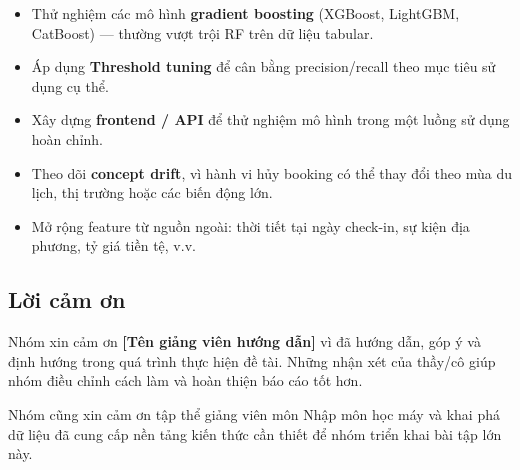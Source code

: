 \documentclass[12pt, a4paper]{article}
\begin{document}
\begin{itemize}
    \item Thử nghiệm các mô hình \textbf{gradient boosting} (XGBoost, LightGBM, CatBoost) --- thường vượt trội RF trên dữ liệu tabular.
    \item Áp dụng \textbf{Threshold tuning} để cân bằng precision/recall theo mục tiêu sử dụng cụ thể.
    \item Xây dựng \textbf{frontend / API} để thử nghiệm mô hình trong một luồng sử dụng hoàn chỉnh.
    \item Theo dõi \textbf{concept drift}, vì hành vi hủy booking có thể thay đổi theo mùa du lịch, thị trường hoặc các biến động lớn.
    \item Mở rộng feature từ nguồn ngoài: thời tiết tại ngày check-in, sự kiện địa phương, tỷ giá tiền tệ, v.v.
\end{itemize}

\subsection*{Lời cảm ơn}

Nhóm xin cảm ơn \textbf{[Tên giảng viên hướng dẫn]} vì đã hướng dẫn, góp ý và định hướng trong quá trình thực hiện đề tài. Những nhận xét của thầy/cô giúp nhóm điều chỉnh cách làm và hoàn thiện báo cáo tốt hơn.

Nhóm cũng xin cảm ơn tập thể giảng viên môn Nhập môn học máy và khai phá dữ liệu đã cung cấp nền tảng kiến thức cần thiết để nhóm triển khai bài tập lớn này.
\end{document}
